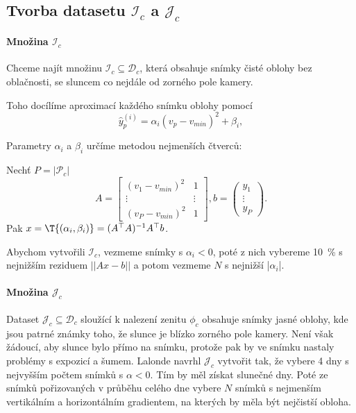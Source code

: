 \subsection{Tvorba datasetu $\mathcal{I}_c$ a $\mathcal{J}_c$}

\paragraph{Množina $\mathcal{I}_c$}


Chceme najít množinu $\mathcal{I}_c \subseteq \mathcal{D}_c$, která obsahuje snímky čisté oblohy bez oblačnosti, se sluncem co nejdále od zorného pole kamery.

Toho docílíme aproximací každého snímku oblohy pomocí
\begin{equation}
    \hat{y}^{(i)}_{p} = \alpha_i(v_p - v_{min})^2 + \beta_i,
\end{equation}

Parametry $\alpha_i$ a $\beta_i$ určíme metodou nejmenších čtverců:
\begin{lemma}
Nechť $P = |\mathcal{P}_c|$
$$A = \begin{bmatrix} (v_1 - v_{min})^2 & 1 \\ \vdots & \vdots \\ (v_P - v_{min})^2 & 1\end{bmatrix}, b = \begin{pmatrix} y_1 \\ \vdots \\ y_P \end{pmatrix}.$$
Pak $x = \T{( \alpha_i,  \beta_i )} = (A^\top A)^{-1} A^\top b$.
\end{lemma}

Abychom vytvořili $\mathcal{I}_c$, vezmeme snímky s $\alpha_i < 0$, poté z nich vybereme 10~\% s nejnižším reziduem $||Ax-b||$ a potom vezmeme $N$ s nejnižší |$\alpha_i$|.

\paragraph{Množina $\mathcal{J}_c$}
Dataset $\mathcal{J}_c \subseteq \mathcal{D}_c$ sloužící k nalezení zenitu $\phi_c$ obsahuje snímky jasné oblohy, kde jsou patrné známky toho, že slunce je blízko zorného pole kamery.
Není však žádoucí, aby slunce bylo přímo na snímku, protože pak by ve snímku nastaly problémy s expozicí a šumem.
Lalonde navrhl $\mathcal{J}_c$ vytvořit tak, že vybere 4 dny s nejvyšším počtem snímků s $\alpha < 0$. Tím by měl získat slunečné dny. 
Poté ze snímků pořizovaných v průběhu celého dne vybere $N$ snímků s nejmenším vertikálním a horizontálním gradientem, na kterých by měla být nejčistší obloha.

